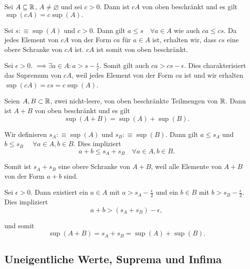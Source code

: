\begin{thm}
  Sei $A \subseteq \mathbb{R}$, $A \neq \varnothing$ und sei $c > 0$. Dann ist $cA$ von oben beschränkt und es gilt $\sup (cA) = c  \sup (A).$
\end{thm}
\begin{prf}
  Sei $s:\equiv\sup(A)$ und $c>0$. Dann gilt $a \leq s \quad \forall a \in A$ wie auch $ca \leq cs$. Da jedes Element von $cA$ von der Form $ca$ für $a \in A$ ist, erhalten wir, dass $cs$ eine obere Schranke von $cA$ ist. $cA$ ist somit von oben beschränkt.

  Sei $\epsilon > 0$. $\implies \exists a \in A: a > s-\frac{\epsilon}{c}$. Somit gilt auch $ca > cs-\epsilon$. Dies charakterisiert das Supremum von $cA$, weil jedes Element von der Form $ca$ ist und wir erhalten $\sup(cA) = cs = c\sup(A)$.
\end{prf}

\begin{thm}
  Seien $A,B \subset \mathbb{R}$, zwei nicht-leere, von oben beschränkte Teilmengen von $\mathbb{R}$. Dann ist $A+B$ von oben beschränkt und es gilt
  \[
    \sup(A+B) = \sup(A) + \sup(B).
  \]
\end{thm}
\begin{prf}
  Wir definieren $s_A :\equiv \sup(A)$ und $s_B :\equiv \sup(B)$. Dann gilt $a \leq s_A$ und $b \leq s_B$ $\quad \forall a \in A, b \in B$. Dies impliziert
  \[
    a+b \leq s_A + s_B \quad \forall a \in A, b\in B.
  \]

  Somit ist $s_A + s_B$ eine obere Schranke von $A+B$, weil alle Elemente von $A+B$ von der Form $a+b$ sind.

  Sei $\epsilon > 0$. Dann existiert ein $a \in A$ mit $a > s_A - \frac{\epsilon}{2}$ und ein $b \in B$ mit $b > s_B - \frac{\epsilon}{2}$. Dies impliziert
  \[
    a+b > (s_A + s_B) - \epsilon,
  \]

  und somit
  \[
    \sup(A+B) = s_A + s_B = \sup(A) + \sup(B).
  \]

  \vspace{-\baselineskip}
\end{prf}

\subsection{Uneigentliche Werte, Suprema und Infima}


